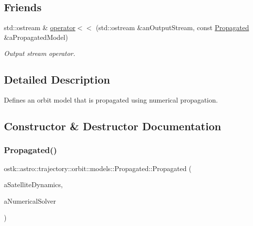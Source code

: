 \subsection*{Friends}
\begin{DoxyCompactItemize}
\item 
std\+::ostream \& \hyperlink{classostk_1_1astro_1_1trajectory_1_1orbit_1_1models_1_1_propagated_aa61df3429a00e0f64a497af2c81075c0}{operator$<$$<$} (std\+::ostream \&an\+Output\+Stream, const \hyperlink{classostk_1_1astro_1_1trajectory_1_1orbit_1_1models_1_1_propagated}{Propagated} \&a\+Propagated\+Model)
\begin{DoxyCompactList}\small\item\em Output stream operator. \end{DoxyCompactList}\end{DoxyCompactItemize}


\subsection{Detailed Description}
Defines an orbit model that is propagated using numerical propagation. 

\subsection{Constructor \& Destructor Documentation}
\mbox{\label{classostk_1_1astro_1_1trajectory_1_1orbit_1_1models_1_1_propagated_ac45b9e7bee7892a67e6eea66561e6fe6}} 
\subsubsection{\texorpdfstring{Propagated()}{Propagated()}\hspace{0.1cm}{\footnotesize\ttfamily [1/2]}}
{\footnotesize\ttfamily ostk\+::astro\+::trajectory\+::orbit\+::models\+::\+Propagated\+::\+Propagated (\begin{DoxyParamCaption}\item[{const \hyperlink{classostk_1_1astro_1_1flight_1_1system_1_1dynamics_1_1_satellite_dynamics}{Satellite\+Dynamics} \&}]{a\+Satellite\+Dynamics,  }\item[{const \hyperlink{classostk_1_1astro_1_1_numerical_solver}{Numerical\+Solver} \&}]{a\+Numerical\+Solver }\end{DoxyParamCaption})}



